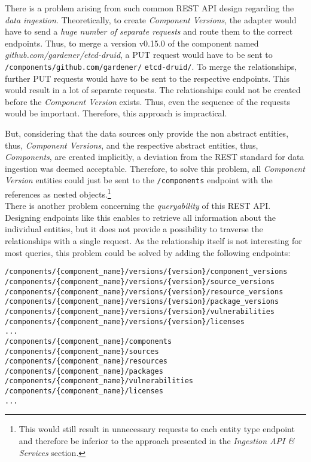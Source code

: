 There is a problem arising from such common REST API design regarding the \emph{data ingestion}. Theoretically, to create \emph{Component Versions}, the adapter would have to send a \emph{huge number of separate requests} and route them to the correct endpoints. Thus, to merge a version v0.15.0 of the component named \emph{github.com/gardener/etcd-druid}, a PUT request would have to be sent to \lstinline|/components/github.com/gardener/| \lstinline|etcd-druid/|. To merge the relationships, further PUT requests would have to be sent to the respective endpoints. This would result in a lot of separate requests. The relationships could not be created before the \emph{Component Version} exists. Thus, even the sequence of the requests would be important. Therefore, this approach is impractical.\par
But, considering that the data sources only provide the non abstract entities, thus, \emph{Component Versions}, and the respective abstract entities, thus, \emph{Components}, are created implicitly, a deviation from the REST standard for data ingestion was deemed acceptable. Therefore, to solve this problem, all \emph{Component Version} entities could just be sent to the \lstinline|/components| endpoint with the references as nested objects.\footnote{This would still result in unnecessary requests to each entity type endpoint and therefore be inferior to the approach presented in the \emph{Ingestion API \& Services} section.}\\

There is another problem concerning the \emph{queryability} of this REST API. Designing endpoints like this enables to retrieve all information about the individual entities, but it does not provide a possibility to traverse the relationships with a single request. As the relationship itself is not interesting for most queries, this problem could be solved by adding the following endpoints:\\

\begin{lstlisting}[caption=REST API Query Endpoints, captionpos=b, label=lst:RESTAPIQueryEndpoints]
/components/{component_name}/versions/{version}/component_versions
/components/{component_name}/versions/{version}/source_versions
/components/{component_name}/versions/{version}/resource_versions
/components/{component_name}/versions/{version}/package_versions
/components/{component_name}/versions/{version}/vulnerabilities
/components/{component_name}/versions/{version}/licenses
...
/components/{component_name}/components
/components/{component_name}/sources
/components/{component_name}/resources
/components/{component_name}/packages
/components/{component_name}/vulnerabilities
/components/{component_name}/licenses
...
\end{lstlisting}

